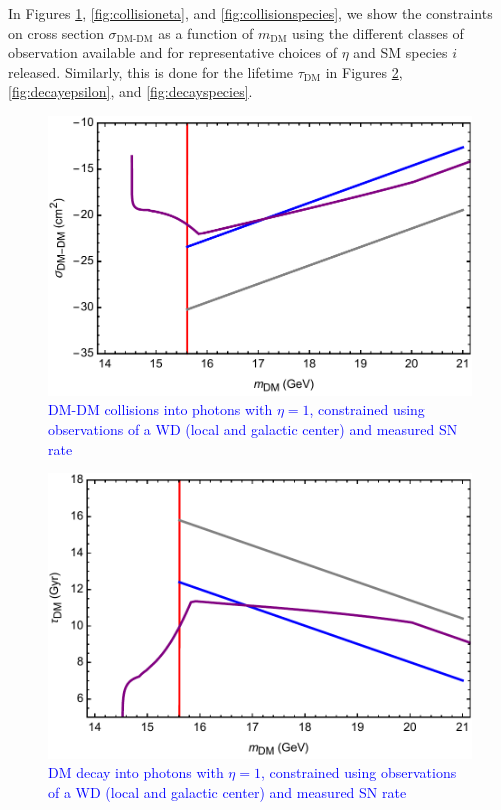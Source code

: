 \documentclass[twocolumn,showpacs,preprintnumbers,amsmath,amssymb,prd]{revtex4}
\begin{document}
In Figures \ref{fig:collisionclasses}, \ref{fig:collisioneta}, and \ref{fig:collisionspecies}, we show the constraints on cross section $\sigma_\text{DM-DM}$ as a function of $m_\text{DM}$ using the different classes of observation available and for representative choices of $\eta$ and SM species $i$ released.
Similarly, this is done for the lifetime $\tau_\text{DM}$ in Figures \ref{fig:decayclasses}, \ref{fig:decayepsilon}, and \ref{fig:decayspecies}.

\begin{figure}
\includegraphics[scale=.45]{collisionobservation.pdf}
\caption{\textcolor{blue}{DM-DM collisions into photons with $\eta =1$, constrained using observations of a WD (local and galactic center) and measured SN rate}}
\label{fig:collisionclasses}
\end{figure}

\begin{figure}
\includegraphics[scale=.45]{decayobservation.pdf}
\caption{\textcolor{blue}{DM decay into photons with $\eta =1$, constrained using observations of a WD (local and galactic center) and measured SN rate}}
\label{fig:decayclasses}
\end{figure}
 
\end{document}
